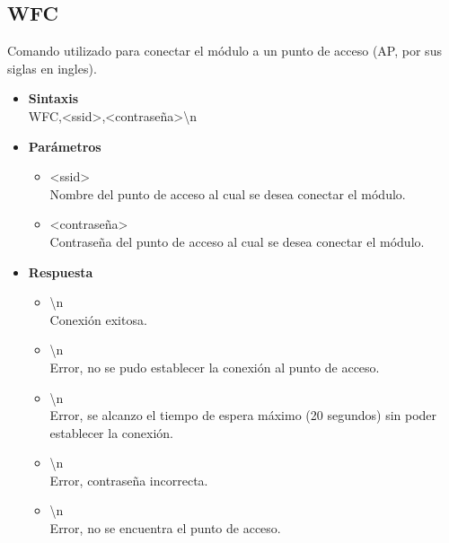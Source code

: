 \documentclass[a4paper,spanish]{article}
\begin{document}
\subsection{WFC}
Comando utilizado para conectar el módulo a un punto de acceso (AP, por sus siglas en ingles). 
\begin{itemize}
	\item \textbf{Sintaxis}\\
	{\ttfamily WFC,\textless ssid\textgreater,\textless contraseña\textgreater\textbackslash n}
	\item \textbf{Parámetros}
	\begin{itemize}
		\item{\ttfamily \textless ssid\textgreater}\\
		Nombre del punto de acceso al cual se desea conectar el módulo.
		\item{\ttfamily \textless contraseña\textgreater}\\
		Contraseña del punto de acceso al cual se desea conectar el módulo.
	\end{itemize}
	\item \textbf{Respuesta}
	\begin{itemize}
		\item{\textbackslash n} \\
		Conexión exitosa.
		\item{\textbackslash n} \\
		Error, no se pudo establecer la conexión al punto de acceso.
		\item{\textbackslash n} \\
		Error, se alcanzo el tiempo de espera máximo (20 segundos) sin poder establecer la conexión.
		\item{\textbackslash n} \\
		Error, contraseña incorrecta.
		\item{\textbackslash n} \\
		Error, no se encuentra el punto de acceso. 
	\end{itemize}
\end{itemize}
\end{document}
